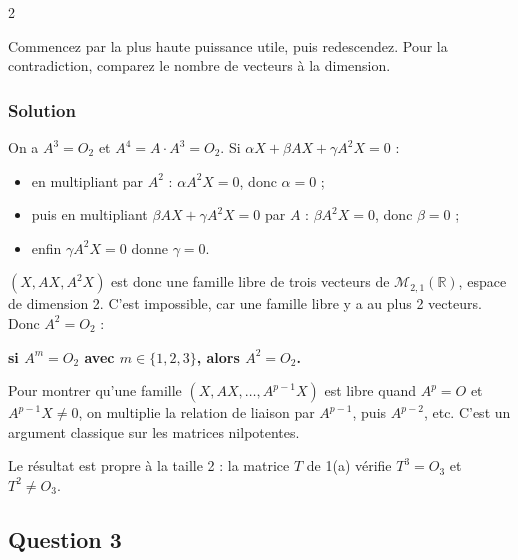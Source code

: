 \documentclass[11pt,a4paper]{article}
\providecommand{\tightlist}{\setlength{\itemsep}{0pt}\setlength{\parskip}{0pt}}
\begin{document}
\begin{indication}{2}

Commencez par la plus haute puissance utile, puis redescendez. Pour la contradiction, comparez le nombre de vecteurs à la dimension.

\end{indication}

\hypertarget{solution-27}{%
\subsubsection{Solution}\label{solution-27}}

On a \(A^3=O_2\) et \(A^4=A\cdot A^3=O_2\). Si \(\alpha X+\beta AX+\gamma A^2X=0\) :

\begin{itemize}
\tightlist
\item
  en multipliant par \(A^2\) : \(\alpha A^2X=0\), donc \(\alpha=0\) ;
\item
  puis en multipliant \(\beta AX+\gamma A^2X=0\) par \(A\) : \(\beta A^2X=0\), donc \(\beta=0\) ;
\item
  enfin \(\gamma A^2X=0\) donne \(\gamma=0\).
\end{itemize}

\((X,AX,A^2X)\) est donc une famille libre de trois vecteurs de \(\mathcal M_{2,1}(\mathbb R)\), espace de dimension 2. C'est impossible, car une famille libre y a au plus 2 vecteurs. Donc \(A^2=O_2\) :

\textbf{si \(A^m=O_2\) avec \(m\in\{1,2,3\}\), alors \(A^2=O_2\).}

\begin{methode}

Pour montrer qu'une famille \((X,AX,\dots,A^{p-1}X)\) est libre quand \(A^p=O\) et \(A^{p-1}X\neq0\), on multiplie la relation de liaison par \(A^{p-1}\), puis \(A^{p-2}\), etc. C'est un argument classique sur les matrices nilpotentes.

\end{methode}

\begin{piege}

Le résultat est propre à la taille 2 : la matrice \(T\) de 1(a) vérifie \(T^3=O_3\) et \(T^2\neq O_3\).

\end{piege}

\hypertarget{question-3}{%
\subsection{Question 3}\label{question-3}}
\end{document}
